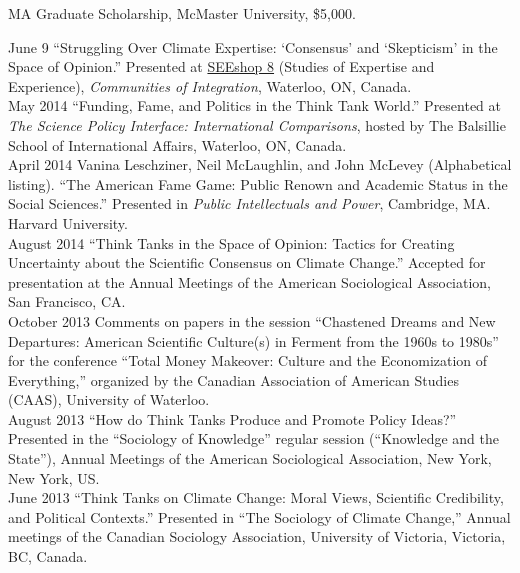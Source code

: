 \documentclass[11pt,usenames,dvipsnames]{article}
\begin{document}
 MA Graduate Scholarship, McMaster University, \$5,000.\\
 

\ind June 9 ``Struggling Over Climate Expertise: `Consensus' and `Skepticism' in the Space of Opinion.'' Presented at \href{http://www.cf.ac.uk/socsi/contactsandpeople/harrycollins/expertise-project/seeshophome.html}{SEEshop 8} (Studies of Expertise and Experience), \emph{Communities of Integration}, Waterloo, ON, Canada. \\

\ind May 2014 ``Funding, Fame, and Politics in the Think Tank World.'' Presented at \emph{The Science Policy Interface: International Comparisons}, hosted by The Balsillie School of International Affairs, Waterloo, ON, Canada. \\

\ind April 2014 Vanina Leschziner, Neil McLaughlin, and John McLevey (Alphabetical listing). ``The American Fame Game: Public Renown and Academic Status in the Social Sciences.'' Presented in \emph{Public Intellectuals and Power}, Cambridge, MA. Harvard University. \\

\ind August 2014 ``Think Tanks in the Space of Opinion: Tactics for Creating Uncertainty about the Scientific Consensus on Climate Change.'' Accepted for presentation at the Annual Meetings of the American Sociological Association, San Francisco, CA. \\

\ind October 2013 Comments on papers in the session ``Chastened Dreams and New Departures: American Scientific Culture(s) in Ferment from the 1960s to 1980s'' for the conference ``Total Money Makeover: Culture and the Economization of Everything,'' organized by the Canadian Association of American Studies (CAAS), University of Waterloo. \\

\ind August 2013 ``How do Think Tanks Produce and Promote Policy Ideas?'' Presented in the ``Sociology of Knowledge'' regular session (``Knowledge and the State''), Annual Meetings of the American Sociological Association, New York, New York, US. \\

\ind June 2013 ``Think Tanks on Climate Change: Moral Views, Scientific Credibility, and Political Contexts.'' Presented in ``The Sociology of Climate Change,'' Annual meetings of the Canadian Sociology Association, University of Victoria, Victoria, BC, Canada. \\
\end{document}
